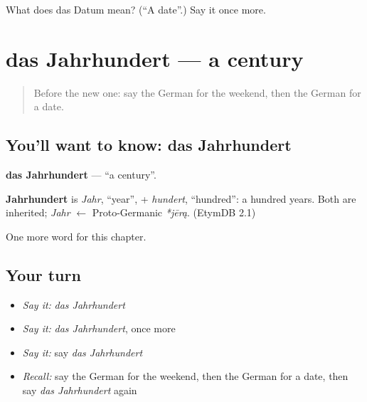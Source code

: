 \begin{tcolorbox}[breakable,colback=teal!4,colframe=teal!35!black,title={Before you move on}]
What does das Datum mean? (\textquotedblleft{}A date\textquotedblright{}.) Say it once more.
\end{tcolorbox}
\section[das Jahrhundert]{das Jahrhundert — a century}

\label{lesson:GE-C137-jahrhundert}



\begin{quote}
Before the new one: say the German for the weekend, then the German for a date.
\end{quote}

\subsection*{You'll want to know: das Jahrhundert}
\textbf{das Jahrhundert} — \textquotedblleft{}a century\textquotedblright{}.

\begin{cousinweb}
\textbf{Jahrhundert} is \emph{Jahr}, \textquotedblleft{}year\textquotedblright{}, + \emph{hundert}, \textquotedblleft{}hundred\textquotedblright{}: a hundred years. Both are inherited; \emph{Jahr} $\leftarrow$ Proto-Germanic \emph{*jērą}. (EtymDB 2.1)
\end{cousinweb}

\begin{grammarlens}[title={What you've built}]
One more word for this chapter.
\end{grammarlens}

\subsection*{Your turn}
\begin{itemize}
\raggedright
  \item \emph{Say it:} \emph{das Jahrhundert}
  \item \emph{Say it:} \emph{das Jahrhundert}, once more
  \item \emph{Say it:} say \emph{das Jahrhundert}
  \item \emph{Recall:} say the German for the weekend, then the German for a date, then say \emph{das Jahrhundert} again
\end{itemize}

